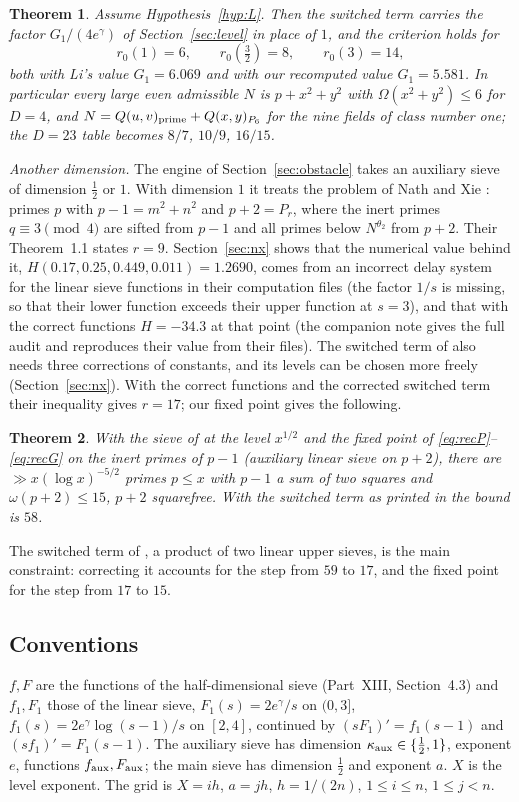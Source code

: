 \documentclass[11pt]{amsart}
\newtheorem{theorem}{Theorem}[section]
\theoremstyle{remark}
\begin{document}
\begin{theorem}\label{thm:level}
Assume Hypothesis~\ref{hyp:L}. Then the switched term carries the factor $G_1/(4e^\gamma)$ of Section~\ref{sec:level} in place of $1$, and the criterion holds for
\[
r_0(1)=6,\qquad r_0(\tfrac32)=8,\qquad r_0(3)=14 ,
\]
both with Li's value $G_1=6.069$ and with our recomputed value $G_1=5.581$. In particular every large even admissible $N$ is $p+x^2+y^2$ with $\Omega(x^2+y^2)\le6$ for $D=4$, and $N=Q(u,v)_{\rm prime}+Q(x,y)_{P_6}$ for the nine fields of class number one; the $D=23$ table becomes $8/7$, $10/9$, $16/15$.
\end{theorem}

\emph{Another dimension.} The engine of Section~\ref{sec:obstacle} takes an auxiliary sieve of dimension $\frac12$ or $1$. With dimension $1$ it treats the problem of Nath and Xie \cite{NX}: primes $p$ with $p-1=m^2+n^2$ and $p+2=P_r$, where the inert primes $q\equiv3\pmod 4$ are sifted from $p-1$ and all primes below $N^{\theta_2}$ from $p+2$. Their Theorem~1.1 states $r=9$. Section~\ref{sec:nx} shows that the numerical value behind it, $H(0.17,0.25,0.449,0.011)=1.2690$, comes from an incorrect delay system for the linear sieve functions in their computation files (the factor $1/s$ is missing, so that their lower function exceeds their upper function at $s=3$), and that with the correct functions $H=-34.3$ at that point (the companion note \cite{ChenNX} gives the full audit and reproduces their value from their files). The switched term of \cite{NX} also needs three corrections of constants, and its levels can be chosen more freely (Section~\ref{sec:nx}). With the correct functions and the corrected switched term their inequality gives $r=17$; our fixed point gives the following.

\begin{theorem}\label{thm:nx}
With the sieve of \cite{NX} at the level $x^{1/2}$ and the fixed point of \eqref{eq:recP}--\eqref{eq:recG} on the inert primes of $p-1$ (auxiliary linear sieve on $p+2$), there are $\gg x(\log x)^{-5/2}$ primes $p\le x$ with $p-1$ a sum of two squares and $\omega(p+2)\le15$, $p+2$ squarefree. With the switched term as printed in \cite{NX} the bound is $58$.
\end{theorem}
The switched term of \cite{NX}, a product of two linear upper sieves, is the main constraint: correcting it accounts for the step from $59$ to $17$, and the fixed point for the step from $17$ to $15$.

\subsection*{Conventions}
$f,F$ are the functions of the half-dimensional sieve (Part~XIII, Section~4.3) and $f_1,F_1$ those of the linear sieve, $F_1(s)=2e^\gamma/s$ on $(0,3]$, $f_1(s)=2e^\gamma\log(s-1)/s$ on $[2,4]$, continued by $(sF_1)'=f_1(s-1)$ and $(sf_1)'=F_1(s-1)$. The auxiliary sieve has dimension $\kappa_{\rm aux}\in\{\frac12,1\}$, exponent $e$, functions $f_{\rm aux},F_{\rm aux}$; the main sieve has dimension $\frac12$ and exponent $a$. $X$ is the level exponent. The grid is $X=ih$, $a=jh$, $h=1/(2n)$, $1\le i\le n$, $1\le j<n$.
\end{document}
